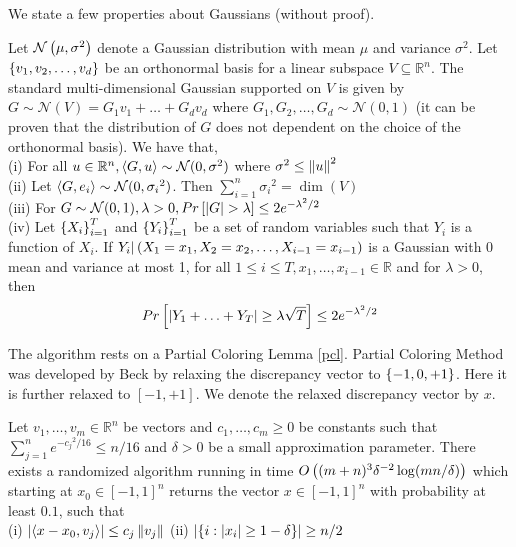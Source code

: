 We state a few properties about Gaussians (without proof).
\begin{Claim} \label{gaussian_properties}
Let $\mathcal{N}\left(\mu,{\sigma}^2 \right )$ denote a Gaussian distribution with mean $\mu$ and variance ${\sigma}^2$. Let $\left\{v_1,v_2,\hdots,v_d\right\}$ be an orthonormal basis for a linear subspace $V \subseteq \mathbb{R}^n$.
The standard multi-dimensional Gaussian supported on $V$ is given by $G \sim \mathcal{N}(V) = G_1v_1 + \hdots + G_dv_d$ where $G_1,G_2,\hdots,G_d \sim \mathcal{N}(0,1)$
(it can be proven that the distribution of $G$ does not dependent on the choice of the orthonormal basis).
We have that,\\
(i) For all $u \in \mathbb{R}^n, \left\langle G,u\right\rangle \sim \mathcal{N}(0,{\sigma}^2)$ where ${\sigma}^2 \leq \left\lVert u \right\rVert^2$\\
(ii) Let $\left\langle G,e_i\right\rangle \sim \mathcal{N}(0,{\sigma_i}^2)$.
Then $\sum_{i=1}^{n}{\sigma_i}^2 = \dim(V)$\\
(iii) For $G \sim \mathcal{N}(0,1), \lambda >0, Pr\left[\left\lvert G \right\rvert>\lambda\right] \leq 2e^{-{\lambda}^2/2} $\\
(iv) Let $\left\{X_i\right\}_{i=1}^{T}$ and $\left\{Y_i\right\}_{i=1}^{T}$ be a set of random variables such that $Y_i$ is a function of $X_i$. If $Y_i|\left(X_1 = x_1,X_2=x_2,\hdots,X_{i-1}=x_{i-1} \right )$ is a Gaussian with 0 mean and variance at most 1, for all $1 \leq i \leq T,x_1,\hdots,x_{i-1}\in \mathbb{R}$ and for $\lambda > 0$, then
\[ Pr\left[\left\lvert Y_1 + \hdots + Y_T \right\rvert \geq \lambda\sqrt{T}\right] \leq 2e^{-{\lambda}^2/2} \]
\end{Claim}

The algorithm rests on a Partial Coloring Lemma \ref{pcl}. Partial Coloring Method was developed by Beck \cite{Beck1981} by relaxing the discrepancy vector to $\left\{-1,0,+1\right\}$. Here it is further relaxed to $\left[-1,+1\right]$.
We denote the relaxed discrepancy vector by $x$.

\begin{lemma} \label{pcl}
Let $v_1,\hdots,v_m \in \mathbb{R}^n$ be vectors and $c_1,\hdots,c_m \geq 0$ be constants such that $\sum_{j=1}^{n}e^{{-c_j}^2/16} \leq n/16$ and $\delta > 0$ be a small approximation parameter.
There exists a randomized algorithm running in time $O\left((m+n)^3{\delta}^{-2}\log(mn/\delta) \right )$ which starting at $x_0 \in [-1,1]^n$ returns the vector $x \in [-1,1]^n$ with probability at least $0.1$, such that\\
\qquad (i) $\left\lvert \left\langle x-x_0,v_j\right\rangle \right\rvert \leq c_j\left\lVert v_j \right\rVert$ \qquad \qquad \qquad \qquad
(ii) $\left\lvert \left\{i: \left\lvert x_i \right\rvert \geq 1- \delta\right\} \right\rvert \geq n/2$
\end{lemma}


